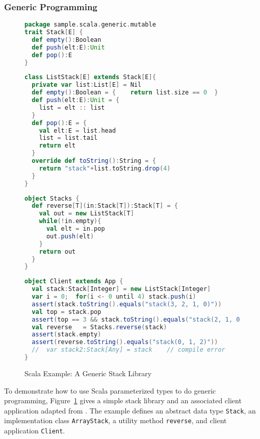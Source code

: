 \subsubsection{Generic Programming}
\label{scala_generic}  
  
\begin{figure}[p]
  \begin{lstlisting}[language=scala]
package sample.scala.generic.mutable
trait Stack[E] {
  def empty():Boolean
  def push(elt:E):Unit
  def pop():E
}
  \end{lstlisting}

  \begin{lstlisting}[language=scala]
class ListStack[E] extends Stack[E]{
  private var list:List[E] = Nil
  def empty():Boolean = {    return list.size == 0  }  
  def push(elt:E):Unit = {
    list = elt :: list
  }
  def pop():E = {
    val elt:E = list.head
    list = list.tail
    return elt
  }  
  override def toString():String = {
    return "stack"+list.toString.drop(4)
  }
}
  \end{lstlisting}
  
  \begin{lstlisting}[language=scala]
object Stacks {
  def reverse[T](in:Stack[T]):Stack[T] = {
    val out = new ListStack[T]
    while(!in.empty){
      val elt = in.pop
      out.push(elt)
    }
    return out
  }
}
  \end{lstlisting}

  \begin{lstlisting}[language=scala]
object Client extends App {
  val stack:Stack[Integer] = new ListStack[Integer]
  var i = 0;  for(i <- 0 until 4) stack.push(i)
  assert(stack.toString().equals("stack(3, 2, 1, 0)"))
  val top = stack.pop
  assert(top == 3 && stack.toString().equals("stack(2, 1, 0)"))
  val reverse 	= Stacks.reverse(stack)
  assert(stack.empty)
  assert(reverse.toString().equals("stack(0, 1, 2)"))  
  //  var stack2:Stack[Any] = stack    // compile error
}
  \end{lstlisting}  
    
  \caption{Scala Example: A Generic Stack Library}
  \label{scala_generic_example}
\end{figure}

To demonstrate how to use Scala parameterized types to do generic programming, 
Figure~\ref{scala_generic_example} gives a simple stack library and an 
associated client application adapted from
\citep[Example 5-2]{JGC}. The example defines an abstract data type {\tt Stack}, an 
implementation class {\tt ArrayStack}, a utility method {\tt reverse}, and 
client application {\tt Client}.

